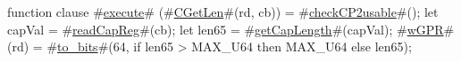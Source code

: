 function clause #\hyperref[zexecute]{execute}# (#\hyperref[zCGetLen]{CGetLen}#(rd, cb)) =
{
  #\hyperref[zcheckCP2usable]{checkCP2usable}#();
  let capVal = #\hyperref[zreadCapReg]{readCapReg}#(cb);
  let len65  = #\hyperref[zgetCapLength]{getCapLength}#(capVal);
  #\hyperref[zwGPR]{wGPR}#(rd) = #\hyperref[ztozybits]{to\_bits}#(64, if len65 > MAX_U64 then MAX_U64 else len65);
}
